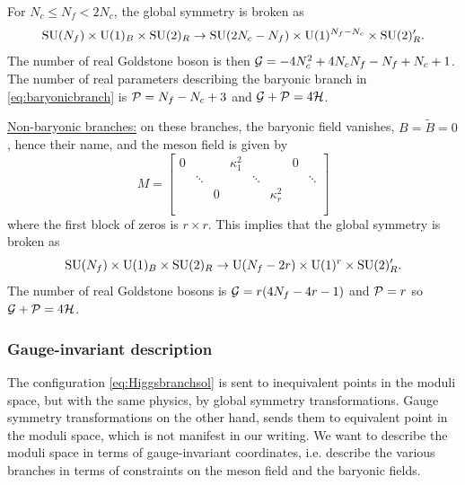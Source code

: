             For $N_c\leq N_f<2N_c$, the global symmetry is broken as
            \begin{equation}
                \text{SU}(N_f)\times\text{U}(1)_B\times\text{SU}(2)_R\to\text{SU}(2N_c-N_f)\times\text{U}(1)^{N_f-N_c}\times\text{SU}(2)'_R.
            \end{equation}
            The number of real Goldstone boson is then $\mathcal{G}=-4N^2_c+4N_cN_f-N_f+N_c+1$. The number of real parameters describing the baryonic branch in \eqref{eq:baryonicbranch} is $\mathcal{P}=N_f-N_c+3$ and $\mathcal{G}+\mathcal{P}=4\mathcal{H}$.

            \underline{Non-baryonic branches:} on these branches, the baryonic field vanishes, $B=\tilde{B}=0$, hence their name, and the meson field is given by
            \begin{equation}
                M=
                \begin{bmatrix}
                    0 & & & \kappa^2_1 & & & 0 & \\
                    & \ddots & & & \ddots & & & \ddots \\
                    & & 0 & & & \kappa^2_r & & \\
                    & & & & & & & \\
                    & & & & & & &
                \end{bmatrix}\label{eq:nonbaryonicbranchmesonfield}
            \end{equation}
            where the first block of zeros is $r\times r$. This implies that the global symmetry is broken as
            \begin{equation}
                \text{SU}(N_f)\times\text{U}(1)_B\times\text{SU}(2)_R\to\text{U}(N_f-2r)\times\text{U}(1)^{r}\times\text{SU}(2)'_R.
            \end{equation}
            The number of real Goldstone bosons is $\mathcal{G}=r(4N_f-4r-1)$ and $\mathcal{P}=r$ so $\mathcal{G}+\mathcal{P}=4\mathcal{H}$.

        \subsubsection{Gauge-invariant description}

            The configuration \eqref{eq:Higgsbranchsol} is sent to inequivalent points in the moduli space, but with the same physics, by global symmetry transformations. Gauge symmetry transformations on the other hand, sends them to equivalent point in the moduli space, which is not manifest in our writing. We want to describe the moduli space in terms of gauge-invariant coordinates, i.e. describe the various branches in terms of constraints on the meson field and the baryonic fields.

